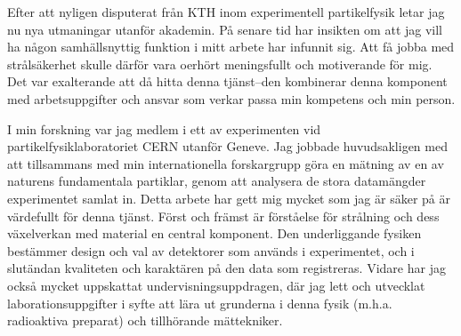 \documentclass[11pt, a4paper]{../awesome-cv} %
\begin{document}
\sloppy %

\makecvheader %

\makelettertitle %


\begin{cvletter}
\vspace{.2cm}

Efter att nyligen disputerat från KTH inom experimentell partikelfysik letar jag nu nya utmaningar utanför akademin. %
På senare tid har insikten om att jag vill ha någon samhällsnyttig funktion i mitt arbete har infunnit sig.
Att få jobba med strålsäkerhet skulle därför vara oerhört meningsfullt och motiverande för mig.
Det var exalterande att då hitta denna tjänst–den kombinerar denna komponent med arbetsuppgifter och ansvar som verkar passa min kompetens och min person.


I min forskning var jag medlem i ett av experimenten vid partikelfysiklaboratoriet CERN utanför Geneve.
Jag jobbade huvudsakligen med att tillsammans med min internationella forskargrupp göra en mätning av en av naturens fundamentala partiklar, genom att analysera de stora datamängder experimentet samlat in. %
Detta arbete har gett mig mycket som jag är säker på är värdefullt för denna tjänst.
Först och främst är förståelse för strålning och dess växelverkan med material en central komponent. %
Den underliggande fysiken bestämmer design och val av detektorer som används i experimentet, och i slutändan kvaliteten och karaktären på den data som registreras. 
Vidare har jag också mycket uppskattat undervisningsuppdragen, där jag lett och utvecklat laborationsuppgifter i syfte att lära ut grunderna i denna fysik (m.h.a. radioaktiva preparat) och tillhörande mättekniker.


\end{cvletter}
\end{document}
